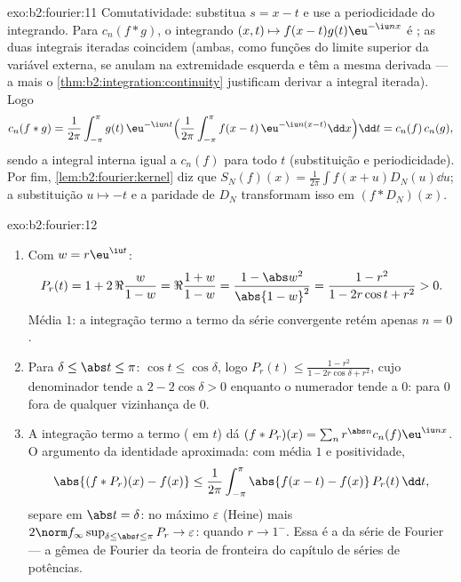 \begin{solution}{exo:b2:fourier:11}
Comutatividade: substitua $s = x - t$ e use a periodicidade do
integrando. Para $c_n(f * g)$, o integrando $(x, t) \mapsto
f(x-t)g(t)\eu^{-\iu nx}$ é ; as duas integrais iteradas
coincidem (ambas, como funções do limite superior da
variável externa, se anulam na extremidade esquerda e têm a mesma
derivada --- a  mais o
\cref{thm:b2:integration:continuity} justificam derivar
a integral iterada). Logo
\[
c_n(f*g) = \frac{1}{2\pi}\int_{-\pi}^{\pi} g(t)\,\eu^{-\iu nt}
\Bigl(\frac{1}{2\pi}\int_{-\pi}^{\pi}
f(x-t)\,\eu^{-\iu n(x-t)}\dd x\Bigr)\dd t
= c_n(f)\,c_n(g),
\]
sendo a integral interna igual a $c_n(f)$ para todo $t$ (substituição
e periodicidade). Por fim, \cref{lem:b2:fourier:kernel} diz que
$S_N(f)(x) = \frac{1}{2\pi}\int f(x+u)D_N(u)\dd u$; a
substituição $u \mapsto -t$ e a paridade de $D_N$ transformam isso
em $(f * D_N)(x)$.
\end{solution}

\begin{solution}{exo:b2:fourier:12}
\begin{enumerate}
  \item Com $w = r\eu^{\iu t}$:
        \[
        P_r(t) = 1 + 2\,\Re\frac{w}{1 - w}
        = \Re\frac{1 + w}{1 - w}
        = \frac{1 - \abs w^2}{\abs{1 - w}^2}
        = \frac{1 - r^2}{1 - 2r\cos t + r^2} > 0 .
        \]
        Média $1$: a integração termo a termo da série 
        convergente retém apenas $n = 0$.
  \item Para $\delta \leq \abs t \leq \pi$: $\cos t \leq
        \cos\delta$, logo $P_r(t) \leq \frac{1 - r^2}{1 -
        2r\cos\delta + r^2}$, cujo denominador tende a $2 -
        2\cos\delta > 0$ enquanto o numerador tende a $0$:
         para $0$ fora de qualquer vizinhança de
        $0$.
  \item A integração termo a termo ( em $t$)
        dá $(f * P_r)(x) = \sum_n r^{\abs
        n}c_n(f)\eu^{\iu nx}$. O argumento da identidade aproximada:
        com média $1$ e positividade,
        \[
        \abs{(f*P_r)(x) - f(x)}
        \leq \frac{1}{2\pi}\int_{-\pi}^{\pi}
        \abs{f(x-t) - f(x)}\,P_r(t)\,\dd t ,
        \]
        separe em $\abs t = \delta$: no máximo $\varepsilon$
        (Heine) mais $2\norm f_\infty\sup_{\delta\leq\abs
        t\leq\pi}P_r \to \varepsilon$:  quando
        $r \to 1^-$. Essa é a  da série de
        Fourier --- a gêmea de Fourier da teoria de fronteira do capítulo
        de séries de potências.
\end{enumerate}
\end{solution}

